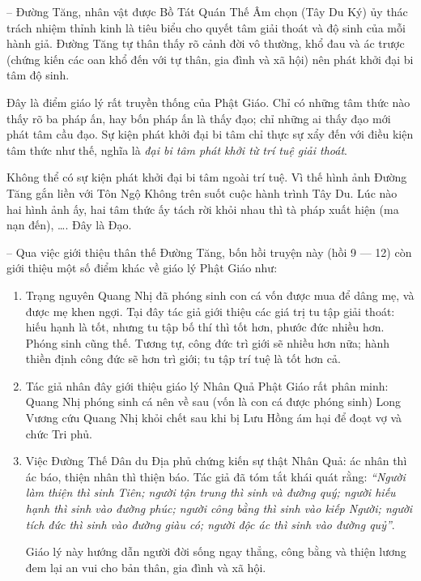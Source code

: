 -- Đường Tăng, nhân vật được Bồ Tát Quán Thế Âm chọn (Tây Du Ký) ủy thác trách nhiệm thỉnh kinh là tiêu biểu cho quyết tâm giải thoát và độ sinh của mỗi hành giả. Đường Tăng tự thân thấy rõ cảnh đời vô thường, khổ đau và ác trược (chứng kiến các oan khổ đến với tự thân, gia đình và xã hội) nên phát khởi đại bi tâm độ sinh.

Đây là điểm giáo lý rất truyền thống của Phật Giáo. Chỉ có những tâm thức nào thấy rõ ba pháp ấn, hay bốn pháp ấn là thấy đạo; chỉ những ai thấy đạo mới phát tâm cầu đạo. Sự kiện phát khởi đại bi tâm chỉ thực sự xẩy đến với điều kiện tâm thức như thế, nghĩa là \emph{đại bi tâm phát khởi từ trí tuệ giải thoát}.

Không thể có sự kiện phát khởi đại bi tâm ngoài trí tuệ. Vì thế hình ảnh Đường Tăng gắn liền với Tôn Ngộ Không trên suốt cuộc hành trình Tây Du. Lúc nào hai hình ảnh ấy, hai tâm thức ấy tách rời khỏi nhau thì tà pháp xuất hiện (ma nạn đến), \ldots. Đây là Đạo.

-- Qua việc giới thiệu thân thế Đường Tăng, bốn hồi truyện này (hồi 9 --- 12) còn giới thiệu một số điểm khác về giáo lý Phật Giáo như:

\begin{enumerate}[label=\itshape\alph*\upshape/]

    \item Trạng nguyên Quang Nhị đã phóng sinh con cá vốn được mua để dâng mẹ, và được mẹ khen ngợi. Tại đây tác giả giới thiệu các giá trị tu tập giải thoát: hiếu hạnh là tốt, nhưng tu tập bố thí thì tốt hơn, phước đức nhiều hơn. Phóng sinh cũng thế. Tương tự, công đức trì giới sẽ nhiều hơn nữa; hành thiền định công đức sẽ hơn trì giới; tu tập trí tuệ là tốt hơn cả.

    \item Tác giả nhân đây giới thiệu giáo lý Nhân Quả Phật Giáo rất phân minh: Quang Nhị phóng sinh cá nên về sau (vốn là con cá được phóng sinh) Long Vương cứu Quang Nhị khỏi chết sau khi bị Lưu Hồng ám hại để đoạt vợ và chức Tri phủ.

    \item Việc Đường Thế Dân du Địa phủ chứng kiến sự thật Nhân Quả: ác nhân thì ác báo, thiện nhân thì thiện báo. Tác giả đã tóm tắt khái quát rằng: \emph{``Người làm thiện thì sinh Tiên; người tận trung thì sinh và đường quý; người hiếu hạnh thì sinh vào đường phúc; người công bằng thì sinh vào kiếp Người; người tích đức thì sinh vào đường giàu có; người độc ác thì sinh vào đường quỷ''}.

    Giáo lý này hướng dẫn người đời sống ngay thẳng, công bằng và thiện lương đem lại an vui cho bản thân, gia đình và xã hội.
\end{enumerate}

